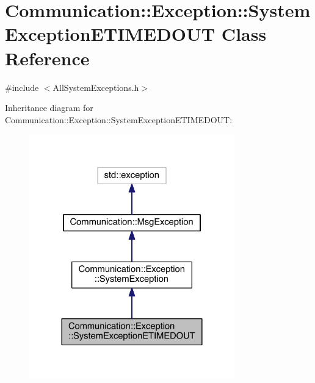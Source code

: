 \hypertarget{class_communication_1_1_exception_1_1_system_exception_e_t_i_m_e_d_o_u_t}{}\section{Communication\+:\+:Exception\+:\+:System\+Exception\+E\+T\+I\+M\+E\+D\+O\+U\+T Class Reference}
\label{class_communication_1_1_exception_1_1_system_exception_e_t_i_m_e_d_o_u_t}


{\ttfamily \#include $<$All\+System\+Exceptions.\+h$>$}



Inheritance diagram for Communication\+:\+:Exception\+:\+:System\+Exception\+E\+T\+I\+M\+E\+D\+O\+U\+T\+:\nopagebreak
\begin{figure}[H]
\begin{center}
\leavevmode
\includegraphics[width=252pt]{class_communication_1_1_exception_1_1_system_exception_e_t_i_m_e_d_o_u_t__inherit__graph}
\end{center}
\end{figure}


